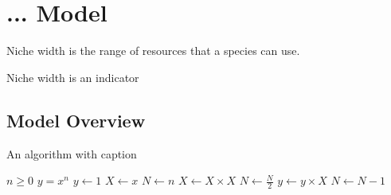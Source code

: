 \section{... Model}
\begin{definition}
    Niche width is the range of resources that a species can use.
\end{definition}
Niche width is an indicator \cite{Alice13}

\subsection{Model Overview}

\begin{algorithm}
    \caption{An algorithm with caption}\label{alg:cap}
    \begin{algorithmic}
    \Require $n \geq 0$
    \Ensure $y = x^n$
    \State $y \gets 1$
    \State $X \gets x$
    \State $N \gets n$
        \State $X \gets X \times X$
        \State $N \gets \frac{N}{2}$  
        \State $y \gets y \times X$
        \State $N \gets N - 1$
    \EndIf
    \EndWhile
    \end{algorithmic}
\end{algorithm}